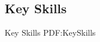 \documentclass[letterpaper,MMMyyyy,nonstop]{simpleresumecv}
\begin{document}
\begin{body}





%
%
%
%

\BigGapNoBreak

\section
{Key Skills}
{Key Skills}
{PDF:KeySkills}


\end{body}
\end{document}
